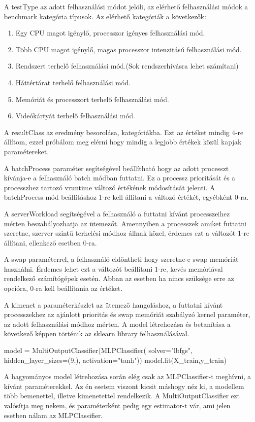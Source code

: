 A testType az adott felhasználási módot jelöli, az elérhető felhasználási módok a benchmark kategória típusok. Az elérhető kategóriák a következők: 
\begin{enumerate}
\item Egy CPU magot igénylő, processzor igényes felhasználási mód.
\item Több CPU magot igénylő, magas processzor intenzitású felhasználási mód.
\item Rendszert terhelő felhasználási mód.(Sok rendszerhívásra lehet számítani)
\item Háttértárat terhelő felhasználási mód.
\item Memóriát és processzort terhelő felhasználási mód.
\item Videókártyát terhelő felhasználási mód.
\end{enumerate}

A resultClass az eredmény besorolása, kategóriákba. Ezt az értéket mindig 4-re állítom, ezzel próbálom meg elérni hogy mindig a legjobb értékek közül kapjak paramétereket.

A batchProcess paraméter segítségével beállítható hogy az adott processzt kívánja-e a felhasználó batch módban futtatni. Ez a processz prioritását és a processzhez tartozó vruntime változó értékének módosítását jelenti. A batchProcess mód beállításhoz 1-re kell állítani a változó értékét, egyébként 0-ra.

A serverWorkload segítségével a felhasználó a futtatni kívánt processzeihez mérten beszabályozhatja az ütemezőt. Amennyiben a processzek amiket futtatni szeretne, szerver szintű terhelési módhoz állnak közel, érdemes ezt a változót 1-re állítani, ellenkező esetben 0-ra.

A swap paraméterrel, a felhasználó eldöntheti hogy szeretne-e swap memóriát használni. Érdemes lehet ezt a változót beállítani 1-re, kevés memóriával rendelkező számítógépek esetén. Abban az esetben ha nincs szüksége erre az opcióra, 0-ra kell beállítania az értéket.

A kimenet a paraméterkészlet az ütemező hangoláshoz, a futtatni kívánt processzekhez az ajánlott prioritás és swap memóriát szabályzó kernel paraméter, az adott felhasználási módhoz mérten.
A model létrehozása és betanítása a következő képpen történik az sklearn library felhasználásával. 
\begin{python}
model = MultiOutputClassifier(MLPClassifier(
	solver="lbfgs",
	hidden_layer_sizes=(9,),
	activation="tanh"))
model.fit(X_train,y_train)
\end{python}
A hagyományos model létrehozása során elég csak az MLPClassifier-t meghívni, a kívánt paraméterekkel. Az én esetem viszont kicsit máshogy néz ki, a modellem több bemenettel, illetve kimenetettel rendelkezik. A MultiOutputClassifier ezt valósítja meg nekem, és paraméterként pedig egy estimator-t vár, ami jelen esetben nálam az MLPClassifier.

